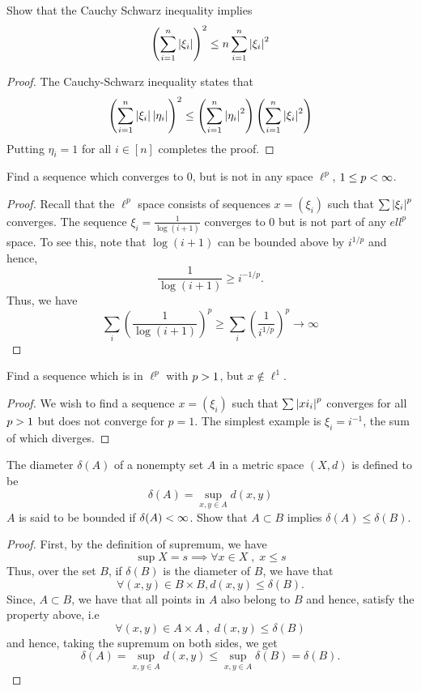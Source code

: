 \begin{question}
    Show that the Cauchy Schwarz inequality implies
    \[\left(\sum_{i=1}^n \left\lvert \xi_i \right\rvert \right)^2 \leq n \sum_{i=1}^n \left\lvert \xi_i \right\rvert^2\]
    \label{section1.2-3}
\end{question}
\begin{proof}
    The Cauchy-Schwarz inequality states that
    \[\left(\sum_{i=1}^n \left\lvert \xi_i \right\rvert \left\lvert \eta_i \right\rvert \right)^2 \leq  \left( \sum_{i=1}^n \left\lvert \eta_i \right\rvert^2 \right)\left( \sum_{i=1}^n \left\lvert \xi_i \right\rvert^2 \right)\]
    Putting $\eta_i = 1$ for all $i \in [n]$ completes the proof.
\end{proof}

\begin{question}
    Find a sequence which converges to $0$, but is not in any space $\ell^p$, $1 \leq p < \infty$. 
    \label{section1.2-4}
\end{question}
\begin{proof}
    Recall that the $\ell^p$ space consists of sequences $x = (\xi_i)$ such that $\sum \left\lvert \xi_i \right\rvert^p$ converges. The sequence $\xi_i = \frac{1}{\log(i + 1)}$ converges to 0 but is not part of any $ell^p$ space. To see this, note that $\log (i+1) $ can be bounded above by $i^{1/p}$ and hence, 
    \[\frac{1}{\log(i+1)} \geq i^{-1/p}.\]
    Thus, we have
    \[\sum_{i} \left(\frac{1}{\log(i+1)} \right)^p \geq \sum_i \left( \frac{1}{i^{1/p}}\right)^p \rightarrow \infty\]
\end{proof}

\begin{question}
    Find a sequence which is in $\ell^p$ with $p > 1$, but $x \notin \ell^1$. 
    \label{section1.2-5}
\end{question}
\begin{proof}
    We wish to find a sequence $x = (\xi_i)$ such that $\sum \left\lvert xi_i \right\rvert^p$ converges for all $p > 1$ but does not converge for $p = 1$. The simplest example is $\xi_i = i^{-1}$, the sum of which diverges.
\end{proof}

\begin{question}
    The diameter $\delta(A)$ of a nonempty set $A$ in a metric space $(X,d)$ is defined to be 
    \[\delta(A) = \sup_{x , y \in A} d(x,y)\]
    $A$ is said to be bounded if $\delta(A) < \infty$. Show that $A \subset B$ implies $\delta(A) \leq \delta(B)$.
    \label{section1.2-6}
\end{question}
\begin{proof}
    First, by the definition of supremum, we have
    \[\sup X = s \implies \forall x \in X \;,\; x \leq s\]
    Thus, over the set $B$, if $\delta(B)$ is the diameter of $B$, we have that
    \[\forall (x , y) \in B \times B , d(x,y) \leq \delta(B).\]
    Since, $A \subset B$, we have that
    all points in $A$ also belong to $B$ and hence, satisfy the property above, i.e
    \[\forall (x,y) \in A \times A \;,\; d(x,y) \leq \delta(B)\]
    and hence, taking the supremum on both sides, we get
    \[\delta(A) = \sup_{x,y \in A} d(x,y) \leq \sup_{x , y \in A}\delta(B) = \delta(B).\]
\end{proof}

